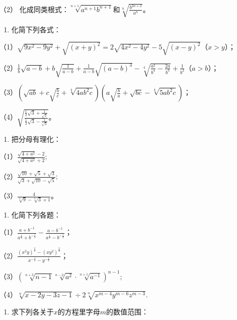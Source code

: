 （2）
化成同类根式：\(\sqrt[n+1]{a^{n+1}b^{n+1}}\)和\(\sqrt[n]{\frac{b^{2n+2}}{a^n}}\)。

\begin{enumerate}[start=27]
\item
  化简下列各式：
\end{enumerate}

（1）\(\sqrt{9x^2 - 9y^2} + \sqrt{(x + y)^2} = 2\sqrt{4x^2 - 4y^2} - 5\sqrt{(x - y)^2}\)（\(x > y\)）；

（2）\(\frac{1}{b}\sqrt{a - b} + b\sqrt{\frac{1}{a - b}} + \frac{1}{a - b}\sqrt{(a - b)^3} - \sqrt[4]{\frac{a^2}{b^4} - \frac{2a}{b^3}} + \frac{1}{b^2}\)（\(a > b\)）；

（3）\(\left(\sqrt{ab} + c\sqrt{\frac{b}{c}} + \sqrt[4]{4ab^2c}\right)\left(a\sqrt{\frac{b}{a}} + \sqrt{bc} - \sqrt[4]{5ab^2c}\right)\)；

（4）\(\sqrt{\frac{\frac{1}{2}\sqrt{3} + \frac{1}{\sqrt{2}}}{\frac{1}{2}\sqrt{3} - \frac{1}{\sqrt{3}}}}\)。

\begin{enumerate}[start=28]
\item
  把分母有理化：
\end{enumerate}

（1）\(\frac{\sqrt{4 + a^2} - 2}{\sqrt{4 + a^2} + 2};\)

（2）\(\frac{\sqrt{10} + \sqrt{5} + \sqrt{3}}{\sqrt{3} + \sqrt{10} - \sqrt{5}};\)

（3）\(\frac{4}{\sqrt[4]{9} - \sqrt[3]{3} + 1}\)。

\begin{enumerate}[start=29]
\item
  化简下列各题：
\end{enumerate}

（1）\(\frac{a + b^{-1}}{a^{\frac{1}{3}} + b^{-\frac{1}{3}}} - \frac{a - b^{-1}}{a^{\frac{1}{3}} - b^{-\frac{1}{3}}}\)；

（2）\(\frac{(x^2y)^{\frac{2}{3}} - (xy^2)^{\frac{3}{3}}}{x^{-\frac{1}{3}} - y^{-\frac{1}{3}}}\)；

（3）\(\left(\sqrt[n + 3]{n - 1}\sqrt[n - 2]{a^2}\cdot \sqrt[n + 1]{a^{-1}}\right)^{n - 1};\)

（4）\(\sqrt[n]{x - 2y - 3z - 1} \div 2\sqrt[n]{x^{m - 4}y^{m - 6}z^{m - 3}}.\)

\begin{enumerate}[start=30]
\item
  求下列各关于\(x\)的方程里字母\(m\)的数值范围：
\end{enumerate}

